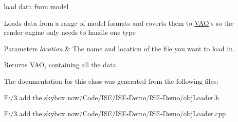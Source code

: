 load data from model 

Loads data from a range of model formats and coverts them to \hyperlink{class_v_a_o}{V\-A\-O}'s so the render engine only needs to handle one type


\begin{DoxyParams}{Parameters}
{\em location} & The name and location of the file you want to load in. \\
\hline
\end{DoxyParams}
\begin{DoxyReturn}{Returns}
\hyperlink{class_v_a_o}{V\-A\-O}, containing all the data. 
\end{DoxyReturn}


The documentation for this class was generated from the following files\-:\begin{DoxyCompactItemize}
\item 
F\-:/3 add the skybox now/\-Code/\-I\-S\-E/\-I\-S\-E-\/\-Demo/\-I\-S\-E-\/\-Demo/obj\-Loader.\-h\item 
F\-:/3 add the skybox now/\-Code/\-I\-S\-E/\-I\-S\-E-\/\-Demo/\-I\-S\-E-\/\-Demo/obj\-Loader.\-cpp\end{DoxyCompactItemize}
